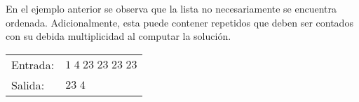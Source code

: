 En el ejemplo anterior se observa que la lista no necesariamente se encuentra ordenada. Adicionalmente, esta puede contener repetidos que deben ser contados con su debida multiplicidad al computar la solución.

\begin{tabular}{ll}
Entrada: &$1\;4\;23\;23\;23\;23$            \\
Salida:  &$23\;4$ \hspace{10mm}
\end{tabular}



